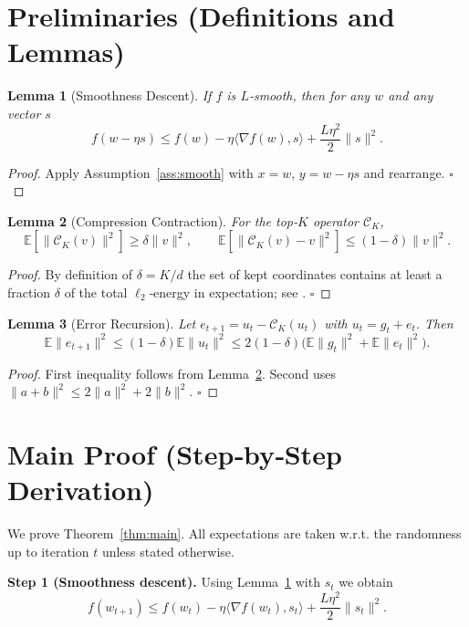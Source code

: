 \documentclass{article}
\newtheorem{lemma}{Lemma}
\begin{document}
\newpage

\section*{Preliminaries (Definitions and Lemmas)}
\begin{lemma}[Smoothness Descent]\label{lem:smooth}
If $f$ is $L$‑smooth, then for any $w$ and any vector $s$
\[
f(w-\eta s)\le f(w)-\eta\langle\nabla f(w),s\rangle+\frac{L\eta^{2}}{2}\|s\|^{2}.
\]
\end{lemma}
\begin{proof}
Apply Assumption~\ref{ass:smooth} with $x=w$, $y=w-\eta s$ and rearrange. \hfill $\square$
\end{proof}
\begin{lemma}[Compression Contraction]\label{lem:compress}
For the top‑$K$ operator $\mathcal{C}_{K}$,
\[
\mathbb{E}\!\left[\| \mathcal{C}_{K}(v)\|^{2}\right]\ge \delta\|v\|^{2},\qquad 
\mathbb{E}\!\left[\| \mathcal{C}_{K}(v)-v\|^{2}\right]\le(1-\delta)\|v\|^{2}.
\]
\end{lemma}
\begin{proof}
By definition of $\delta=K/d$ the set of kept coordinates contains at least a fraction $\delta$ of the total $\ell_{2}$‑energy in expectation; see \cite{stich2018sparsified}. \hfill $\square$
\end{proof}
\begin{lemma}[Error Recursion]\label{lem:error}
Let $e_{t+1}=u_{t}-\mathcal{C}_{K}(u_{t})$ with $u_{t}=g_{t}+e_{t}$. Then
\[
\mathbb{E}\|e_{t+1}\|^{2}\le(1-\delta)\mathbb{E}\|u_{t}\|^{2}
\le 2(1-\delta)\bigl(\mathbb{E}\|g_{t}\|^{2}+\mathbb{E}\|e_{t}\|^{2}\bigr).
\tag{2}
\]
\end{lemma}
\begin{proof}
First inequality follows from Lemma~\ref{lem:compress}.  
Second uses $\|a+b\|^{2}\le2\|a\|^{2}+2\|b\|^{2}$. \hfill $\square$
\end{proof}

\section*{Main Proof (Step‑by‑Step Derivation)}
We prove Theorem~\ref{thm:main}. All expectations are taken w.r.t. the randomness up to iteration $t$ unless stated otherwise.

\bigskip
\noindent\textbf{Step 1 (Smoothness descent).}  
Using Lemma~\ref{lem:smooth} with $s_{t}$ we obtain
\[
f(w_{t+1})\le f(w_{t})-\eta\langle\nabla f(w_{t}),s_{t}\rangle
+\frac{L\eta^{2}}{2}\|s_{t}\|^{2}.
\tag{3}\label{eq:smooth}
\]
\end{document}
